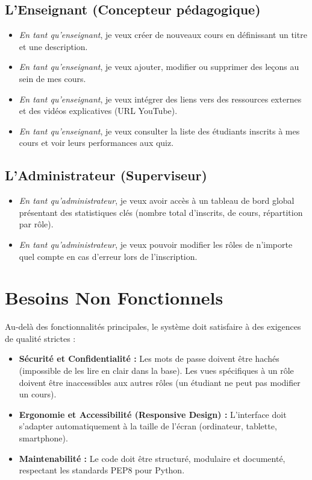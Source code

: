\documentclass[12pt,a4paper]{report}
\begin{document}
\subsection{L'Enseignant (Concepteur pédagogique)}
\begin{itemize}[label=\faChalkboardTeacher]
    \item \textit{En tant qu'enseignant}, je veux créer de nouveaux cours en définissant un titre et une description.
    \item \textit{En tant qu'enseignant}, je veux ajouter, modifier ou supprimer des leçons au sein de mes cours.
    \item \textit{En tant qu'enseignant}, je veux intégrer des liens vers des ressources externes et des vidéos explicatives (URL YouTube).
    \item \textit{En tant qu'enseignant}, je veux consulter la liste des étudiants inscrits à mes cours et voir leurs performances aux quiz.
\end{itemize}

\subsection{L'Administrateur (Superviseur)}
\begin{itemize}[label=\faUserShield]
    \item \textit{En tant qu'administrateur}, je veux avoir accès à un tableau de bord global présentant des statistiques clés (nombre total d'inscrits, de cours, répartition par rôle).
    \item \textit{En tant qu'administrateur}, je veux pouvoir modifier les rôles de n'importe quel compte en cas d'erreur lors de l'inscription.
\end{itemize}

\section{Besoins Non Fonctionnels}
Au-delà des fonctionnalités principales, le système doit satisfaire à des exigences de qualité strictes :
\begin{itemize}
    \item \textbf{Sécurité et Confidentialité :} Les mots de passe doivent être hachés (impossible de les lire en clair dans la base). Les vues spécifiques à un rôle doivent être inaccessibles aux autres rôles (un étudiant ne peut pas modifier un cours).
    \item \textbf{Ergonomie et Accessibilité (Responsive Design) :} L'interface doit s'adapter automatiquement à la taille de l'écran (ordinateur, tablette, smartphone).
    \item \textbf{Maintenabilité :} Le code doit être structuré, modulaire et documenté, respectant les standards PEP8 pour Python.
\end{itemize}
\end{document}
